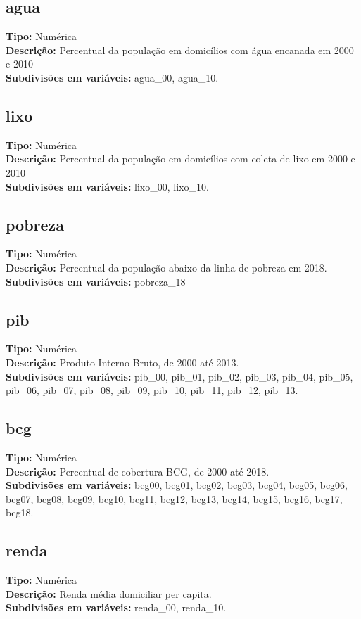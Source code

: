\documentclass[12pt]{article}
\begin{document}
		\subsection{agua}
		{\bf Tipo:} Numérica \\
		{\bf Descrição:} Percentual da população em domicílios com água encanada em 2000 e 2010 \\
		{\bf Subdivisões em variáveis:} agua\_00, agua\_10.
		\subsection{lixo}
		{\bf Tipo:} Numérica \\
		{\bf Descrição:} Percentual da população em domicílios com coleta de lixo em 2000 e 2010 \\
		{\bf Subdivisões em variáveis:} lixo\_00, lixo\_10.
		\subsection{pobreza}
		{\bf Tipo:} Numérica \\
		{\bf Descrição:} Percentual da população abaixo da linha de pobreza em 2018. \\
		{\bf Subdivisões em variáveis:} pobreza\_18
		\subsection{pib}
		{\bf Tipo:} Numérica \\
		{\bf Descrição:} Produto Interno Bruto, de 2000 até 2013. \\
		{\bf Subdivisões em variáveis:} pib\_00, pib\_01, pib\_02, pib\_03, pib\_04, pib\_05, pib\_06, pib\_07, pib\_08,
		pib\_09, pib\_10, pib\_11, pib\_12, pib\_13.
		\subsection{bcg}
		{\bf Tipo:} Numérica \\
		{\bf Descrição:} Percentual de cobertura BCG, de 2000 até 2018. \\
		{\bf Subdivisões em variáveis:} bcg00, bcg01, bcg02, bcg03, bcg04, bcg05, bcg06, bcg07, bcg08, bcg09, bcg10, bcg11,
		bcg12, bcg13, bcg14, bcg15, bcg16, bcg17, bcg18.
		\subsection{renda}
		{\bf Tipo:} Numérica \\
		{\bf Descrição:} Renda média domiciliar per capita. \\
		{\bf Subdivisões em variáveis:} renda\_00, renda\_10.
	
\end{document}
